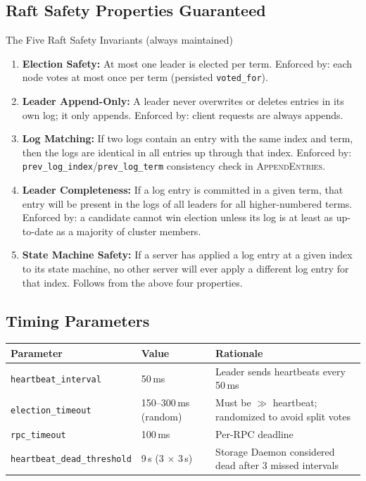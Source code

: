 \documentclass[12pt,a4paper]{article}
\begin{document}
\subsection{Raft Safety Properties Guaranteed}

\begin{protocolbox}{The Five Raft Safety Invariants (always maintained)}
\begin{enumerate}[leftmargin=2em]
  \item \textbf{Election Safety:} At most one leader is elected per term. Enforced by: each node votes at most once per term (persisted \texttt{voted\_for}).
  \item \textbf{Leader Append-Only:} A leader never overwrites or deletes entries in its own log; it only appends. Enforced by: client requests are always appends.
  \item \textbf{Log Matching:} If two logs contain an entry with the same index and term, then the logs are identical in all entries up through that index. Enforced by: \texttt{prev\_log\_index}/\texttt{prev\_log\_term} consistency check in \textsc{AppendEntries}.
  \item \textbf{Leader Completeness:} If a log entry is committed in a given term, that entry will be present in the logs of all leaders for all higher-numbered terms. Enforced by: a candidate cannot win election unless its log is at least as up-to-date as a majority of cluster members.
  \item \textbf{State Machine Safety:} If a server has applied a log entry at a given index to its state machine, no other server will ever apply a different log entry for that index. Follows from the above four properties.
\end{enumerate}
\end{protocolbox}

\subsection{Timing Parameters}

\begin{center}
\begin{tabular}{lll}
\toprule
Parameter & Value & Rationale \\
\midrule
\texttt{heartbeat\_interval} & 50\,ms & Leader sends heartbeats every 50\,ms \\
\texttt{election\_timeout} & 150--300\,ms (random) & Must be $\gg$ heartbeat; randomized to avoid split votes \\
\texttt{rpc\_timeout} & 100\,ms & Per-RPC deadline \\
\texttt{heartbeat\_dead\_threshold} & 9\,s (3 $\times$ 3\,s) & Storage Daemon considered dead after 3 missed intervals \\
\bottomrule
\end{tabular}
\end{center}
\end{document}
